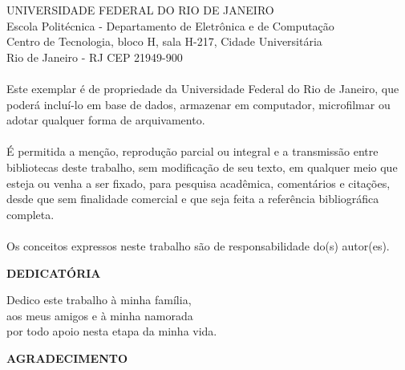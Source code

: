       \vspace{0.5cm}

UNIVERSIDADE FEDERAL DO RIO DE JANEIRO \\
Escola Politécnica - Departamento de Eletrônica e de Computação \\
Centro de Tecnologia, bloco H, sala H-217, Cidade Universitária \\ 
Rio de Janeiro - RJ      CEP 21949-900\\
\vspace{0.5cm}
\paragraph{}Este exemplar é de propriedade da Universidade Federal do Rio de Janeiro, que poderá incluí-lo em base de dados, armazenar em computador, microfilmar ou adotar qualquer forma de arquivamento.
\paragraph{}É permitida a menção, reprodução parcial ou integral e a transmissão entre bibliotecas deste trabalho, sem modificação de seu texto, em qualquer meio que esteja ou venha a ser fixado, para pesquisa acadêmica, comentários e citações, desde que sem finalidade comercial e que seja feita a referência bibliográfica completa.
\paragraph{}Os conceitos expressos neste trabalho são de responsabilidade do(s) autor(es).


\pagebreak

\begin{center}
\textbf{DEDICATÓRIA}
\end{center}
      \vspace*{\fill}

{\raggedleft\vfill\itshape{%

Dedico este trabalho à minha família,\\ aos meus amigos e à minha namorada\\por todo apoio nesta etapa da minha vida.
}\par
}

\pagebreak


\begin{center}
\textbf{AGRADECIMENTO}
\end{center}
      \vspace{0.5cm}

